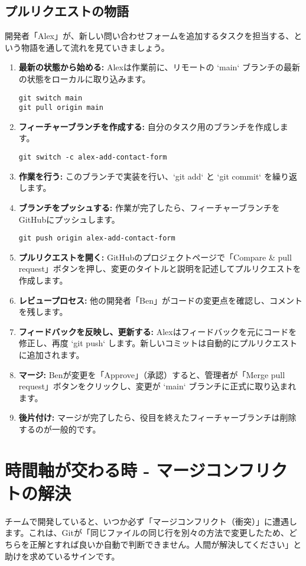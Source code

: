 \documentclass{ltjsarticle}
\begin{document}
\subsection{プルリクエストの物語}
開発者「Alex」が、新しい問い合わせフォームを追加するタスクを担当する、という物語を通して流れを見ていきましょう。
\begin{enumerate}
    \item \textbf{最新の状態から始める:} Alexは作業前に、リモートの `main` ブランチの最新の状態をローカルに取り込みます。
    \begin{verbatim}
git switch main
git pull origin main
\end{verbatim}
    \item \textbf{フィーチャーブランチを作成する:} 自分のタスク用のブランチを作成します。
    \begin{verbatim}
git switch -c alex-add-contact-form
\end{verbatim}
    \item \textbf{作業を行う:} このブランチで実装を行い、`git add` と `git commit` を繰り返します。
    \item \textbf{ブランチをプッシュする:} 作業が完了したら、フィーチャーブランチをGitHubにプッシュします。
    \begin{verbatim}
git push origin alex-add-contact-form
\end{verbatim}
    \item \textbf{プルリクエストを開く:} GitHubのプロジェクトページで「Compare & pull request」ボタンを押し、変更のタイトルと説明を記述してプルリクエストを作成します。
    \item \textbf{レビュープロセス:} 他の開発者「Ben」がコードの変更点を確認し、コメントを残します。
    \item \textbf{フィードバックを反映し、更新する:} Alexはフィードバックを元にコードを修正し、再度 `git push` します。新しいコミットは自動的にプルリクエストに追加されます。
    \item \textbf{マージ:} Benが変更を「Approve」（承認）すると、管理者が「Merge pull request」ボタンをクリックし、変更が `main` ブランチに正式に取り込まれます。
    \item \textbf{後片付け:} マージが完了したら、役目を終えたフィーチャーブランチは削除するのが一般的です。
\end{enumerate}

\section{時間軸が交わる時 - マージコンフリクトの解決}
チームで開発していると、いつか必ず「マージコンフリクト（衝突）」に遭遇します。これは、Gitが「同じファイルの同じ行を別々の方法で変更したため、どちらを正解とすれば良いか自動で判断できません。人間が解決してください」と助けを求めているサインです。
\end{document}
